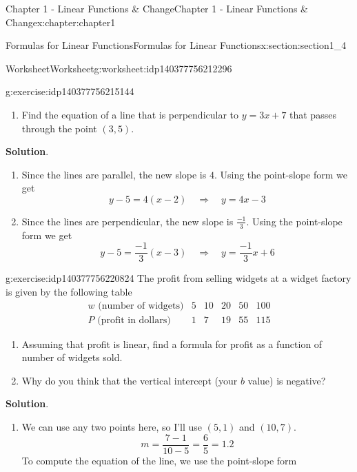 \documentclass[oneside,10pt,]{book}
\newcommand{\blocktitlefont}{\relax}
\begin{document}
\begin{chapterptx}{Chapter 1 - Linear Functions \& Change}{}{Chapter 1 - Linear Functions \& Change}{}{}{x:chapter:chapter1}
\begin{sectionptx}{Formulas for Linear Functions}{}{Formulas for Linear Functions}{}{}{x:section:section1_4}
\begin{worksheet-subsection}{Worksheet}{}{Worksheet}{}{}{g:worksheet:idp140377756212296}
\begin{divisionexercise}{2}{}{}{g:exercise:idp140377756215144}
\begin{enumerate}[label=(\alph*)]
\item{}Find the equation of a line that is perpendicular to \(y=3x+7\) that passes through the point \((3,5)\).%
\end{enumerate}
\textbf{\blocktitlefont Solution}.\hypertarget{g:solution:idp140377756216872}{}\quad{}%
\begin{enumerate}[label=(\alph*)]
\item{}Since the lines are parallel, the new slope is \(4\). Using the point-slope form we get%
\begin{equation*}
y-5=4(x-2) \quad \Rightarrow \quad y=4x-3
\end{equation*}
%
\item{}Since the lines are perpendicular, the new slope is \(\frac{-1}{3}\). Using the point-slope form we get%
\begin{equation*}
y-5=\frac{-1}{3}(x-3) \quad \Rightarrow \quad y=\frac{-1}{3}x+6
\end{equation*}
%
\end{enumerate}
\end{divisionexercise}%
\begin{divisionexercise}{3}{}{}{g:exercise:idp140377756220824}%
The profit from selling widgets at a widget factory is given by the following table%
\begin{equation*}
\begin{array}{l|c|c|c|c|c}
w \text{ (number of widgets)} & 5 & 10 & 20 & 50 & 100 \\
\hline P \text{ (profit in dollars)} & 1 & 7 & 19 & 55 & 115
\end{array}
\end{equation*}
%
\begin{enumerate}[label=(\alph*)]
\item{}Assuming that profit is linear, find a formula for profit as a function of number of widgets sold.%
\item{}Why do you think that the vertical intercept (your \(b\) value) is negative?%
\end{enumerate}
\textbf{\blocktitlefont Solution}.\hypertarget{g:solution:idp140377756223128}{}\quad{}%
\begin{enumerate}[label=(\alph*)]
\item{}We can use any two points here, so I'll use \((5,1)\) and \((10,7)\).%
\begin{equation*}
m = \frac{7-1}{10-5}=\frac 65 = 1.2 
\end{equation*}
To compute the equation of the line, we use the point-slope form%
\begin{equation*}

\end{equation*}
\end{enumerate}
\end{divisionexercise}
\end{worksheet-subsection}
\end{sectionptx}
\end{chapterptx}
\end{document}
